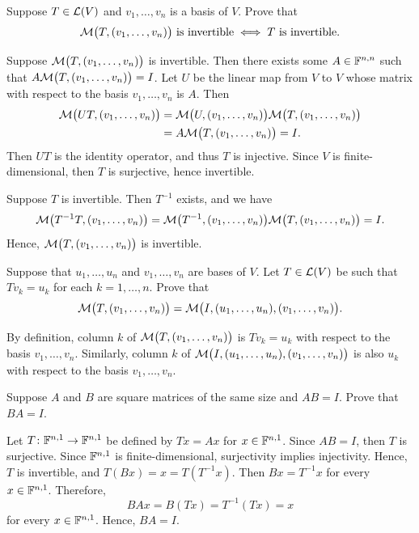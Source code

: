 \begin{exc}
\begin{exercise}
Suppose $T\in\mathcal{L}(V)$ and $v_1,\dots,v_n$ is a basis of $V$. Prove that
\[ \mathcal{M}\bigl(T,(v_1,\dots,v_n)\bigr) \text{ is invertible} \iff
   T \text{ is invertible}. \]
\end{exercise}
\begin{solution}
Suppose $\mathcal{M}\bigl(T,(v_1,\dots,v_n)\bigr)$ is invertible. Then there exists
some $A\in\mathbb{F}^{n,n}$ such that $A\mathcal{M}\bigl(T,(v_1,\dots,v_n)\bigr)=I$. Let $U$
be the linear map from $V$ to $V$ whose matrix with respect to the basis
$v_1,\dots,v_n$ is $A$. Then
\begin{align*}
\mathcal{M}\bigl(UT,(v_1,\dots,v_n)\bigr)
  &= \mathcal{M}\bigl(U,(v_1,\dots,v_n)\bigr)\mathcal{M}\bigl(T,(v_1,\dots,v_n)\bigr)\\
  &= A\mathcal{M}\bigl(T,(v_1,\dots,v_n)\bigr) = I.
\end{align*}
Then $UT$ is the identity operator, and thus $T$ is injective. Since $V$ is
finite-dimensional, then $T$ is surjective, hence invertible.

Suppose $T$ is invertible. Then $T^{-1}$ exists, and we have
\[ \mathcal{M}\bigl(T^{-1}T,(v_1,\dots,v_n)\bigr)
   = \mathcal{M}\bigl(T^{-1},(v_1,\dots,v_n)\bigr)\mathcal{M}\bigl(T,(v_1,\dots,v_n)\bigr)
   = I. \]
Hence, $\mathcal{M}\bigl(T,(v_1,\dots,v_n)\bigr)$ is invertible.
\end{solution}

\begin{exercise}
Suppose that $u_1,\dots,u_n$ and $v_1,\dots,v_n$ are bases of $V$. Let
$T\in\mathcal{L}(V)$ be such that $Tv_k=u_k$ for each $k=1,\dots,n$. Prove that
\[ \mathcal{M}\bigl(T,(v_1,\dots,v_n)\bigr)
   = \mathcal{M}\bigl(I,(u_1,\dots,u_n),(v_1,\dots,v_n)\bigr). \]
\end{exercise}
\begin{solution}
By definition, column $k$ of $\mathcal{M}\bigl(T,(v_1,\dots,v_n)\bigr)$ is $Tv_k=u_k$
with respect to the basis $v_1,\dots,v_n$. Similarly, column $k$ of
$\mathcal{M}\bigl(I,(u_1,\dots,u_n),(v_1,\dots,v_n)\bigr)$ is also $u_k$ with respect
to the basis $v_1,\dots,v_n$.
\end{solution}

\begin{exercise}
Suppose $A$ and $B$ are square matrices of the same size and $AB=I$. Prove that
$BA=I$.
\end{exercise}
\begin{solution}
Let $T\colon\mathbb{F}^{n,1}\to\mathbb{F}^{n,1}$ be defined by $Tx=Ax$ for $x\in\mathbb{F}^{n,1}$.
Since $AB=I$, then $T$ is surjective. Since $\mathbb{F}^{n,1}$ is finite-dimensional,
surjectivity implies injectivity. Hence, $T$ is invertible, and
$T(Bx)=x=T(T^{-1}x)$. Then $Bx=T^{-1}x$ for every $x\in\mathbb{F}^{n,1}$. Therefore,
\[ BAx = B(Tx) = T^{-1}(Tx) = x \]
for every $x\in\mathbb{F}^{n,1}$. Hence, $BA=I$.
\end{solution}

\vspace{2em}
\end{exc}
